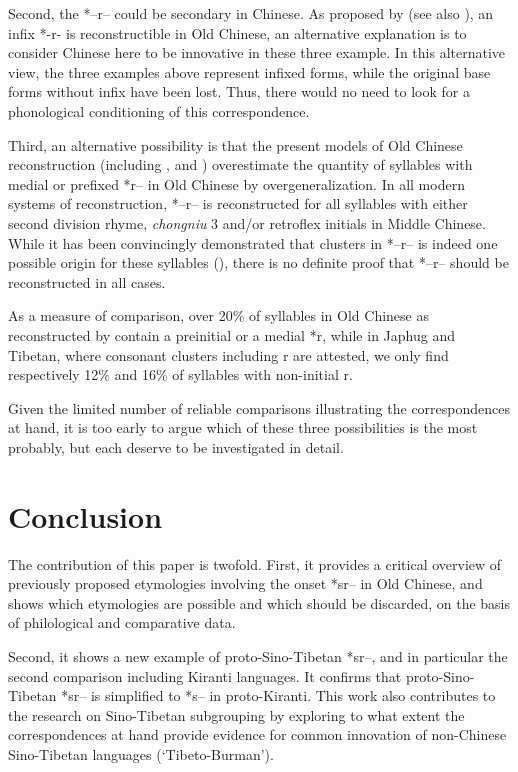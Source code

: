 \documentclass[oldfontcommands,oneside,a4paper,11pt]{article}
\newcommand{\ipa}[1]{{\phon #1}} %
\begin{document}
Second, the *\ipa{--r--} could be secondary in Chinese. As proposed by \citet{sagart99roc} (see also \citealt[57-8]{bs14oc}), an infix *\ipa{-r-} is reconstructible in Old Chinese, an alternative explanation is to consider Chinese here to be innovative in these three example. In this alternative view, the three examples above represent infixed forms, while the original base forms without infix have been lost. Thus, there would no need to look for a phonological conditioning of this correspondence.

Third, an alternative possibility is that the present models of Old Chinese reconstruction (including \citealt{starostin89}, \citealt{schuessler09minimal} and \citealt{bs14oc}) overestimate the quantity of syllables with medial or prefixed *\ipa{r}-- in Old Chinese by overgeneralization. In all modern systems of reconstruction,  *--\ipa{r}--  is reconstructed for all syllables with either second division rhyme, 	\textit{chongniu} 3 and/or retroflex initials in Middle Chinese. While it has been convincingly demonstrated that clusters in *--\ipa{r}-- is indeed one possible origin for these syllables (\citealt{yakhontov61sochetaniya}), there is no definite proof that  *--\ipa{r}-- should be reconstructed in all cases. 

As a measure of comparison, over 20\% of syllables in Old Chinese as reconstructed by \citet{bs14oc} contain a preinitial or a medial *\ipa{r}, while in Japhug and Tibetan, where consonant clusters including \ipa{r} are attested, we only find respectively 12\% and 16\% of syllables with non-initial \ipa{r}. 

Given the limited number of reliable comparisons illustrating the correspondences at hand, it is too early to argue which of these three possibilities is the most probably, but each deserve to be investigated in detail.

\section{Conclusion}

The contribution of this paper is twofold. First, it provides a critical overview of previously proposed etymologies involving the onset *\ipa{sr--} in Old Chinese, and shows which etymologies are possible and which should be discarded, on the basis of philological and comparative data.

Second, it shows a new example of proto-Sino-Tibetan *\ipa{sr--}, and in particular the second comparison including Kiranti languages. It confirms that proto-Sino-Tibetan *\ipa{sr--} is simplified to *\ipa{s--} in proto-Kiranti. This work also contributes to the research on Sino-Tibetan subgrouping by exploring to what extent the correspondences at hand provide evidence for common innovation of non-Chinese Sino-Tibetan languages (`Tibeto-Burman').
\end{document}
